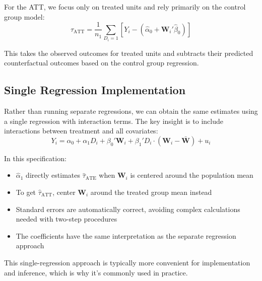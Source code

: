 \documentclass[12pt]{article}
\begin{document}
\begin{multicols}{2}
For the ATT, we focus only on treated units and rely primarily on the control group model:
$$\hat{\tau}_{\text{ATT}} = \frac{1}{n_1} \sum_{D_i=1} [Y_i - (\hat{\alpha}_0 + \bm{W}_i'\hat{\beta}_0)]$$

This takes the observed outcomes for treated units and subtracts their predicted counterfactual outcomes based on the control group regression.

\subsection*{Single Regression Implementation}

Rather than running separate regressions, we can obtain the same estimates using a single regression with interaction terms.
The key insight is to include interactions between treatment and all covariates:
$$Y_i = \alpha_0 + \alpha_1 D_i + \beta_0' \bm{W}_i + \beta_1' D_i \cdot (\bm{W}_i - \bar{\bm{W}}) + u_i$$

In this specification:
\begin{itemize}
  \item $\hat{\alpha}_1$ directly estimates $\hat{\tau}_{\text{ATE}}$ when $\bm{W}_i$ is centered around the population mean
  \item To get $\hat{\tau}_{\text{ATT}}$, center $\bm{W}_i$ around the treated group mean instead
  \item Standard errors are automatically correct, avoiding complex calculations needed with two-step procedures
  \item The coefficients have the same interpretation as the separate regression approach
\end{itemize}

This single-regression approach is typically more convenient for implementation and inference, which is why it's commonly used in practice.


\end{multicols}
\end{document}
